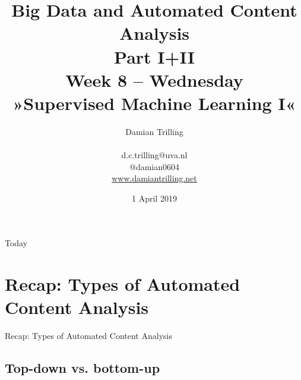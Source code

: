 \documentclass{beamer}
\begin{document}
\title[Big Data and Automated Content Analysis]{\textbf{Big Data and Automated Content Analysis\\ Part I+II} \\ Week 8 -- Wednesday \\ »Supervised Machine Learning I«}
\author[Damian Trilling]{Damian Trilling \\ ~ \\ \footnotesize{d.c.trilling@uva.nl \\@damian0604} \\ \url{www.damiantrilling.net}}
\date{1 April 2019}


\begin{frame}{}
\titlepage
\end{frame}

\begin{frame}{Today}
\tableofcontents
\end{frame}




\section[Recap]{Recap: Types of Automated Content Analysis}
\begin{frame}{}
Recap: Types of Automated Content Analysis
\end{frame}
\subsection*{Top-down vs. bottom-up}


\begin{frame}[plain]
\end{frame}
\end{document}
